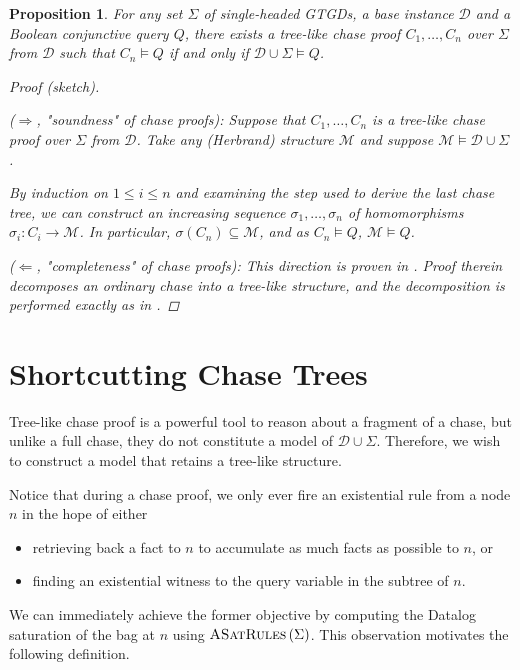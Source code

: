 \documentclass[12pt]{report}
\theoremstyle{plain}
\newtheorem{proposition}[theorem]{Proposition}
\theoremstyle{definition}
\newcommand{\ASatRules}[1]{\ensuremath{\normalfont{\textsc{ASatRules}} \left( #1 \right)}}
\begin{document}
\begin{proposition}
\label{chase-proof-completeness}
  For any set $\Sigma$ of single-headed GTGDs, a base instance $\mathcal{D}$ and a Boolean conjunctive query $Q$, there exists a tree-like chase proof $C_1, \ldots, C_n$ over $\Sigma$ from $\mathcal{D}$ such that $C_n \models Q$ if and only if $\mathcal{D} \cup \Sigma \models Q$.
  \begin{proof}[Proof (sketch)] $ $\par
    ($\Longrightarrow$, "soundness" of chase proofs): Suppose that $C_1, \ldots, C_n$ is a tree-like chase proof over $\Sigma$ from $\mathcal{D}$. Take any (Herbrand) structure $\mathcal{M}$ and suppose $\mathcal{M} \models \mathcal{D} \cup \Sigma$.
    
    By induction on $1 \leq i \leq n$ and examining the step used to derive the last chase tree, we can construct an increasing sequence $\sigma_1, \ldots, \sigma_n$ of homomorphisms $\sigma_i: C_i \rightarrow \mathcal{M}$. In particular, $\sigma(C_n) \subseteq \mathcal{M}$, and as $C_n \models Q$, $\mathcal{M} \models Q$.

    ($\Longleftarrow$, "completeness" of chase proofs): This direction is proven in \cite[Proposition 2.6.9]{kappelmann_2019}. Proof therein decomposes an ordinary chase into a tree-like structure, and the decomposition is performed exactly as in .
  \end{proof}
\end{proposition}

\section{Shortcutting Chase Trees}

Tree-like chase proof is a powerful tool to reason about a fragment of a chase, but unlike a full chase, they do not constitute a model of $\mathcal{D} \cup \Sigma$. Therefore, we wish to construct a model that retains a tree-like structure.

Notice that during a chase proof, we only ever fire an existential rule from a node $n$ in the hope of either
\begin{itemize}
  \item retrieving back a fact to $n$ to accumulate as much facts as possible to $n$, or
  \item finding an existential witness to the query variable in the subtree of $n$.
\end{itemize}
We can immediately achieve the former objective by computing the Datalog saturation of the bag at $n$ using $\ASatRules{\Sigma}$. This observation motivates the following definition.
\end{document}
